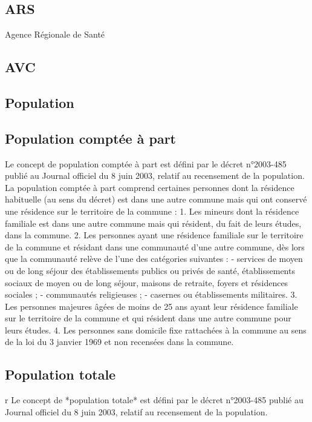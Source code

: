 \documentclass[12pt,english,french,twoside]{report}\usepackage[]{graphicx}\usepackage[]{color}
\begin{document}
\subsection*{ARS}
Agence Régionale de Santé

\subsection*{AVC}

\subsection*{Population}

\subsection*{Population comptée à part}
Le concept de population comptée à part est défini par le décret n°2003-485 publié au Journal officiel du 8 juin 2003, relatif au recensement de la population.
La population comptée à part comprend certaines personnes dont la résidence habituelle (au sens du décret) est dans une autre commune mais qui ont conservé une résidence sur le territoire de la commune :
1. Les mineurs dont la résidence familiale est dans une autre commune mais qui résident, du fait de leurs études, dans la commune.
2. Les personnes ayant une résidence familiale sur le territoire de la commune et résidant dans une communauté d'une autre commune, dès lors que la communauté relève de l'une des catégories suivantes :
- services de moyen ou de long séjour des établissements publics ou privés de santé, établissements sociaux de moyen ou de long séjour, maisons de retraite, foyers et résidences sociales ;
- communautés religieuses ;
- casernes ou établissements militaires.
3. Les personnes majeures âgées de moins de 25 ans ayant leur résidence familiale sur le territoire de la commune et qui résident dans une autre commune pour leurs études.
4. Les personnes sans domicile fixe rattachées à la commune au sens de la loi du 3 janvier 1969 et non recensées dans la commune. \cite{8}


\subsection*{Population totale}
r
Le concept de *population totale* est défini par le décret n°2003-485 publié au Journal officiel du 8 juin 2003, relatif au recensement de la population.
\end{document}
